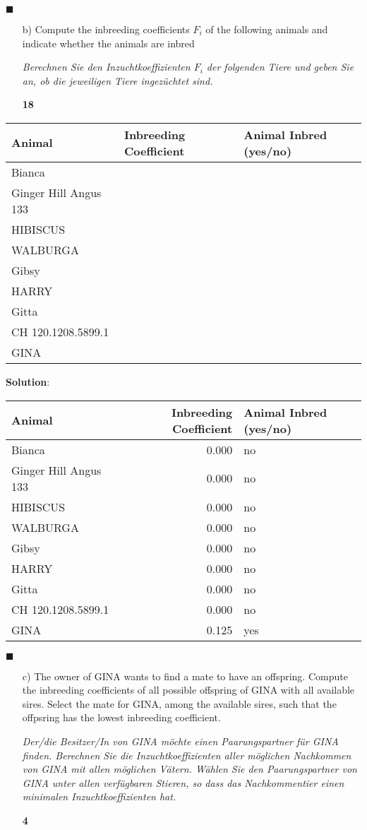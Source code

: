 \documentclass[
]{article}
\newcommand{\points}[1]
{\begin{flushright}\textbf{#1}\end{flushright}}
\newcommand{\solstart}
{\vspace{3ex}\textbf{Solution}:}
\newcommand{\solend}
{\vspace{2ex}$\blacksquare$}
\begin{document}
\solend

\clearpage
\pagebreak

\begin{enumerate}
\item[b)] Compute the inbreeding coefficients $F_i$ of the following animals and indicate whether the animals are inbred

\textit{Berechnen Sie den Inzuchtkoeffizienten $F_i$ der folgenden Tiere und geben Sie an, ob die jeweiligen Tiere ingezüchtet sind.}
\points{18}
\end{enumerate}

\begin{tabular}{lll}
\toprule
Animal & Inbreeding Coefficient & Animal Inbred (yes/no)\\
\midrule
Bianca &  & \\
Ginger Hill Angus 133 &  & \\
HIBISCUS &  & \\
WALBURGA &  & \\
Gibsy &  & \\
\addlinespace
HARRY &  & \\
Gitta &  & \\
CH 120.1208.5899.1 &  & \\
GINA &  & \\
\bottomrule
\end{tabular}

\solstart

\begin{tabular}{lrl}
\toprule
Animal & Inbreeding Coefficient & Animal Inbred (yes/no)\\
\midrule
Bianca & 0.000 & no\\
Ginger Hill Angus 133 & 0.000 & no\\
HIBISCUS & 0.000 & no\\
WALBURGA & 0.000 & no\\
Gibsy & 0.000 & no\\
\addlinespace
HARRY & 0.000 & no\\
Gitta & 0.000 & no\\
CH 120.1208.5899.1 & 0.000 & no\\
GINA & 0.125 & yes\\
\bottomrule
\end{tabular}

\solend

\clearpage
\pagebreak

\begin{enumerate}
\item[c)] The owner of GINA wants to find a mate to have an offspring. Compute the inbreeding coefficients of all possible offspring of GINA with all available sires. Select the mate for GINA, among the available sires, such that the offpsring has the lowest inbreeding coefficient. 

\textit{Der/die Besitzer/In von GINA möchte einen Paarungspartner für GINA finden. Berechnen Sie die Inzuchtkoeffizienten aller möglichen Nachkommen von GINA mit allen möglichen Vätern. Wählen Sie den Paarungspartner von GINA unter allen verfügbaren Stieren, so dass das Nachkommentier einen minimalen Inzuchtkoeffizienten hat.}
\points{4}
\end{enumerate}
\end{document}
